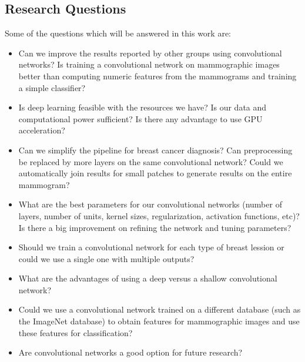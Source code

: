 \subsection{Research Questions}
Some of the questions which will be answered in this work are:
\begin{itemize} 
	\item Can we improve the results reported by other groups using convolutional networks? Is training a convolutional network on mammographic images better than computing numeric features from the mammograms and training a simple classifier?
	\item Is deep learning feasible with the resources we have? Is our data and computational power sufficient? Is there any advantage to use GPU acceleration?
	\item Can we simplify the pipeline for breast cancer diagnosis? Can preprocessing be replaced by more layers on the same convolutional network? Could we automatically join results for small patches to generate results on the entire mammogram?
	\item What are the best parameters for our convolutional networks (number of layers, number of units, kernel sizes, regularization, activation functions, etc)? Is there a big improvement on refining the network and tuning parameters?
	\item Should we train a convolutional network for each type of breast lession or could we use a single one with multiple outputs?
	\item What are the advantages of using a deep versus a shallow convolutional network? 
	\item Could we use a convolutional network trained on a different database (such as the ImageNet database) to obtain features for mammographic images and use these features for classification?
	\item Are convolutional networks a good option for future research?
\end{itemize}

\begin{comment}
Las {\it Hipótesis}, que de acuerdo a Sampieri {\it indican lo que estamos
  buscando 
o tratando de probar y pueden definirse como explicaciones tentativas del
fenómeno investigado y formuladas a manera de proposiciones}. Las hipótesis
surgen normalmente de los {\it Objetivos} y proponen contestar tentativamente
  las preguntas de investigación.

{\bf Las preguntas de investigación se incluyen aquí ......}
\end{comment}
